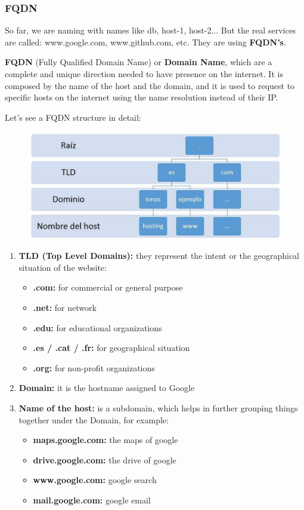 \documentclass{article}
\begin{document}
\subsubsection{FQDN}

So far, we are naming with names like db, host-1, host-2... But the real services are called: www.google.com, www.github.com, etc. They are using \textbf{FQDN's}.

\textbf{FQDN} (Fully Qualified Domain Name) or \textbf{Domain Name}, which are a complete and unique direction needed to have presence on the internet. It is composed by the name of the host and the domain, and it is used to request to specific hosts on the internet using the name resolution instead of their IP.

Let's see a FQDN structure in detail:

\begin{figure}[H]
    \centering
    \includegraphics[scale=0.4]{pictures/image11.PNG}
\end{figure}

\begin{enumerate}
    \item \textbf{TLD (Top Level Domains):} they represent the intent or the geographical situation of the website:
    \begin{itemize}
        \item \textbf{.com:} for commercial or general purpose
        \item \textbf{.net:} for network
        \item \textbf{.edu:} for educational organizations
        \item \textbf{.es / .cat / .fr:} for geographical situation
        \item \textbf{.org:} for non-profit organizations
    \end{itemize}

    \item \textbf{Domain:} it is the hostname assigned to Google
    \item \textbf{Name of the host:} is a subdomain, which helps in further grouping things together under the Domain, for example:
    \begin{itemize}
        \item \textbf{maps.google.com:} the maps of google
        \item \textbf{drive.google.com:} the drive of google
        \item \textbf{www.google.com:} google search
        \item \textbf{mail.google.com:} google email
    \end{itemize}
\end{enumerate}
\end{document}
